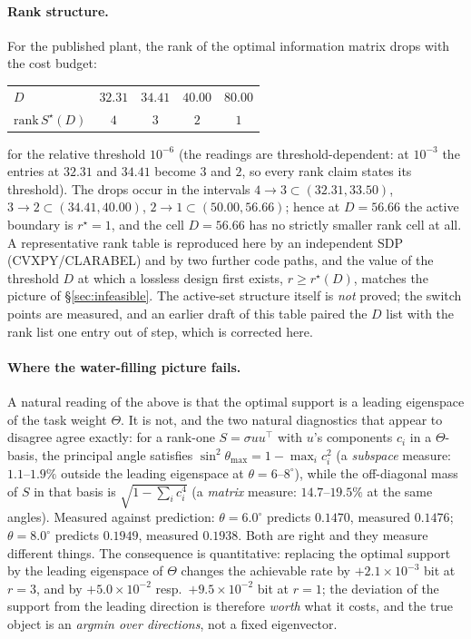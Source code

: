 \documentclass[journal]{IEEEtran}
\theoremstyle{remark}
\begin{document}
\paragraph{Rank structure.} For the published plant, the rank of the optimal
information matrix drops with the cost budget:
\begin{center}\footnotesize
\begin{tabular}{lcccc}
\toprule
$D$ & $32.31$ & $34.41$ & $40.00$ & $80.00$ \\
$\mathrm{rank}\,S^{\star}(D)$ & $4$ & $3$ & $2$ & $1$ \\
\bottomrule
\end{tabular}
\end{center}
for the relative threshold $10^{-6}$ (the readings are threshold-dependent: at
$10^{-3}$ the entries at $32.31$ and $34.41$ become $3$ and $2$, so every rank
claim states its threshold). The drops occur in the intervals
$4\!\to\!3\subset(32.31,33.50)$, $3\!\to\!2\subset(34.41,40.00)$,
$2\!\to\!1\subset(50.00,56.66)$; hence at $D=56.66$ the active boundary is
$r^{\star}=1$, and the cell $D=56.66$ has no strictly smaller rank cell at all.
A representative rank table is reproduced here by an independent SDP
(CVXPY/CLARABEL) and by two further code paths, and the value of the threshold
$D$ at which a lossless design first exists, $r\ge r^{\star}(D)$, matches the
picture of \S\ref{sec:infeasible}. The active-set structure itself is \emph{not}
proved; the switch points are measured, and an earlier draft of this table paired
the $D$ list with the rank list one entry out of step, which is corrected here.

\paragraph{Where the water-filling picture fails.} A natural reading of the above
is that the optimal support is a leading eigenspace of the task weight $\Theta$.
It is not, and the two natural diagnostics that appear to disagree agree exactly:
for a rank-one $S=\sigma uu^{\top}$ with $u$'s components $c_i$ in a $\Theta$-basis,
the principal angle satisfies $\sin^2\theta_{\max}=1-\max_ic_i^2$ (a
\emph{subspace} measure: $1.1$--$1.9\%$ outside the leading eigenspace at
$\theta=6$--$8^\circ$), while the off-diagonal mass of $S$ in that basis is
$\sqrt{1-\sum_ic_i^4}$ (a \emph{matrix} measure: $14.7$--$19.5\%$ at the same
angles). Measured against prediction: $\theta=6.0^\circ$ predicts $0.1470$,
measured $0.1476$; $\theta=8.0^\circ$ predicts $0.1949$, measured $0.1938$. Both
are right and they measure different things. The consequence is quantitative:
replacing the optimal support by the leading eigenspace of $\Theta$ changes the
achievable rate by $+2.1\times10^{-3}$ bit at $r=3$, and by
$+5.0\times10^{-2}$ resp.\ $+9.5\times10^{-2}$ bit at $r=1$; the deviation of the
support from the leading direction is therefore \emph{worth} what it costs, and
the true object is an \emph{argmin over directions}, not a fixed eigenvector.
\end{document}

